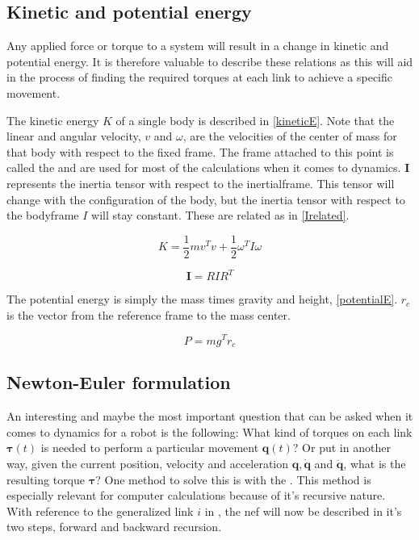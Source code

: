 \subsection{Kinetic and potential energy}


Any applied force or torque to a system will result in a change in kinetic and potential energy. It is therefore valuable to describe these relations as this will aid in the process of finding the required torques at each link to achieve a specific movement.

The kinetic energy $K$ of a single body is described in \eqref{kineticE}. Note that the linear and angular velocity, $v$ and $\omega$, are the velocities of the center of mass for that body with respect to the fixed frame. The frame attached to this point is called the  and are used for most of the calculations when it comes to dynamics. $\mathbf{I}$ represents the inertia tensor with respect to the \gls{inertialframe}. This tensor will change with the configuration of the body, but the inertia tensor with respect to the \gls{bodyframe} $I$ will stay constant. These are related as in \eqref{Irelated}.

\begin{equation}\label{kineticE}
K = \frac{1}{2}mv^Tv + \frac{1}{2}\omega ^{T}  I \omega
\end{equation}

\begin{equation}\label{Irelated}
\mathbf{I} = RIR^T
\end{equation}

The potential energy is simply the mass times gravity and height, \eqref{potentialE}. $r_c$ is the vector from the reference frame to the mass center.

\begin{equation}\label{potentialE}
P = mg^Tr_c
\end{equation}



\subsection{Newton-Euler formulation}

An interesting and maybe the most important question that can be asked when it comes to dynamics for a robot is the following: What kind of torques on each link $\mathbf{\tau}(t)$ is needed to perform a particular movement $\mathbf{q}(t)$? Or put in another way, given the current position, velocity and acceleration $\mathbf{q}, \mathbf{\dot{q}}$ and $ \mathbf{\ddot{q}}$, what is the resulting torque $\mathbf{\tau}$? One method to solve this is with the . This method is especially relevant for computer calculations because of it's recursive nature. With reference to the generalized link $i$ in , the  \gls{nef} will now be described in it's two steps, forward and backward recursion.

